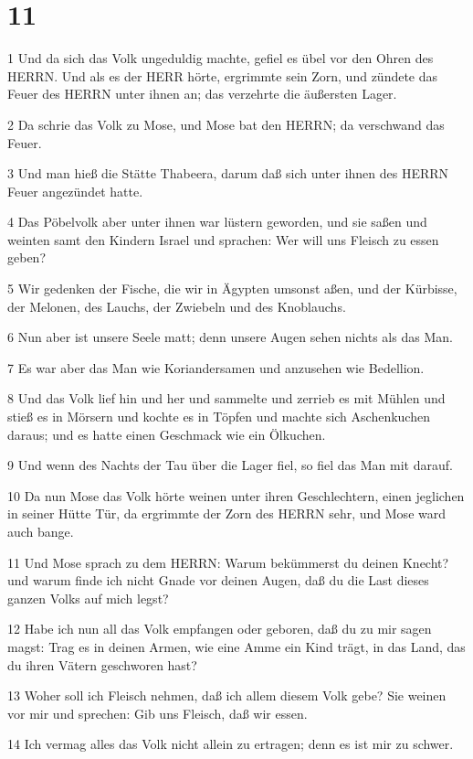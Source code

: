 \chapter{11}

\par 1 Und da sich das Volk ungeduldig machte, gefiel es übel vor den Ohren des HERRN. Und als es der HERR hörte, ergrimmte sein Zorn, und zündete das Feuer des HERRN unter ihnen an; das verzehrte die äußersten Lager.
\par 2 Da schrie das Volk zu Mose, und Mose bat den HERRN; da verschwand das Feuer.
\par 3 Und man hieß die Stätte Thabeera, darum daß sich unter ihnen des HERRN Feuer angezündet hatte.
\par 4 Das Pöbelvolk aber unter ihnen war lüstern geworden, und sie saßen und weinten samt den Kindern Israel und sprachen: Wer will uns Fleisch zu essen geben?
\par 5 Wir gedenken der Fische, die wir in Ägypten umsonst aßen, und der Kürbisse, der Melonen, des Lauchs, der Zwiebeln und des Knoblauchs.
\par 6 Nun aber ist unsere Seele matt; denn unsere Augen sehen nichts als das Man.
\par 7 Es war aber das Man wie Koriandersamen und anzusehen wie Bedellion.
\par 8 Und das Volk lief hin und her und sammelte und zerrieb es mit Mühlen und stieß es in Mörsern und kochte es in Töpfen und machte sich Aschenkuchen daraus; und es hatte einen Geschmack wie ein Ölkuchen.
\par 9 Und wenn des Nachts der Tau über die Lager fiel, so fiel das Man mit darauf.
\par 10 Da nun Mose das Volk hörte weinen unter ihren Geschlechtern, einen jeglichen in seiner Hütte Tür, da ergrimmte der Zorn des HERRN sehr, und Mose ward auch bange.
\par 11 Und Mose sprach zu dem HERRN: Warum bekümmerst du deinen Knecht? und warum finde ich nicht Gnade vor deinen Augen, daß du die Last dieses ganzen Volks auf mich legst?
\par 12 Habe ich nun all das Volk empfangen oder geboren, daß du zu mir sagen magst: Trag es in deinen Armen, wie eine Amme ein Kind trägt, in das Land, das du ihren Vätern geschworen hast?
\par 13 Woher soll ich Fleisch nehmen, daß ich allem diesem Volk gebe? Sie weinen vor mir und sprechen: Gib uns Fleisch, daß wir essen.
\par 14 Ich vermag alles das Volk nicht allein zu ertragen; denn es ist mir zu schwer.
